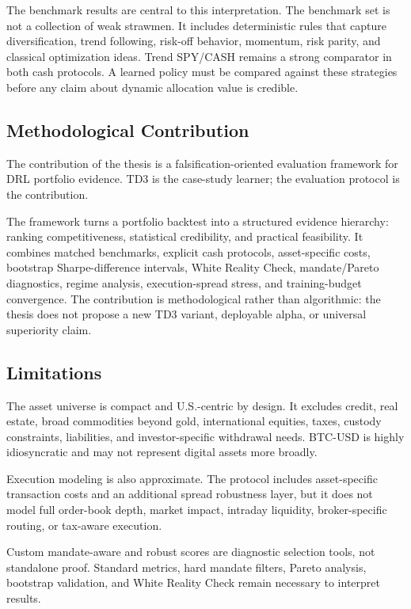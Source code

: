 \documentclass[12pt]{article}
\begin{document}
The benchmark results are central to this interpretation. The benchmark set is not a collection of weak strawmen. It includes deterministic rules that capture diversification, trend following, risk-off behavior, momentum, risk parity, and classical optimization ideas. Trend SPY/CASH remains a strong comparator in both cash protocols. A learned policy must be compared against these strategies before any claim about dynamic allocation value is credible.

\subsection{Methodological Contribution}

The contribution of the thesis is a falsification-oriented evaluation framework for DRL portfolio evidence. TD3 is the case-study learner; the evaluation protocol is the contribution.

The framework turns a portfolio backtest into a structured evidence hierarchy: ranking competitiveness, statistical credibility, and practical feasibility. It combines matched benchmarks, explicit cash protocols, asset-specific costs, bootstrap Sharpe-difference intervals, White Reality Check, mandate/Pareto diagnostics, regime analysis, execution-spread stress, and training-budget convergence. The contribution is methodological rather than algorithmic: the thesis does not propose a new TD3 variant, deployable alpha, or universal superiority claim.

\subsection{Limitations}

The asset universe is compact and U.S.-centric by design. It excludes credit, real estate, broad commodities beyond gold, international equities, taxes, custody constraints, liabilities, and investor-specific withdrawal needs. BTC-USD is highly idiosyncratic and may not represent digital assets more broadly.

Execution modeling is also approximate. The protocol includes asset-specific transaction costs and an additional spread robustness layer, but it does not model full order-book depth, market impact, intraday liquidity, broker-specific routing, or tax-aware execution.

Custom mandate-aware and robust scores are diagnostic selection tools, not standalone proof. Standard metrics, hard mandate filters, Pareto analysis, bootstrap validation, and White Reality Check remain necessary to interpret results.
\end{document}
